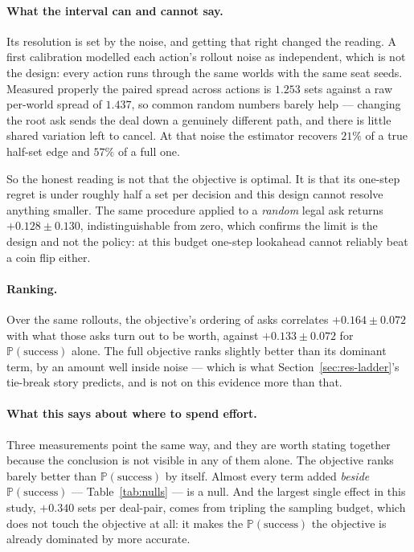 \documentclass[11pt,a4paper]{article}
\newcommand{\Prob}{\ensuremath{\mathbb{P}}}
\begin{document}
\paragraph{What the interval can and cannot say.} Its resolution is set by the
noise, and getting that right changed the reading. A first calibration modelled
each action's rollout noise as independent, which is not the design: every
action runs through the same worlds with the same seat seeds. Measured properly
the paired spread across actions is $1.253$ sets against a raw per-world spread
of $1.437$, so common random numbers barely help --- changing the root ask sends
the deal down a genuinely different path, and there is little shared variation
left to cancel. At that noise the estimator recovers $21\%$ of a true half-set
edge and $57\%$ of a full one.

So the honest reading is not that the objective is optimal. It is that its
one-step regret is under roughly half a set per decision and this design cannot
resolve anything smaller. The same procedure applied to a \emph{random} legal ask
returns $+0.128 \pm 0.130$, indistinguishable from zero, which confirms the limit
is the design and not the policy: at this budget one-step lookahead cannot
reliably beat a coin flip either.

\paragraph{Ranking.} Over the same rollouts, the objective's ordering of asks
correlates $+0.164 \pm 0.072$ with what those asks turn out to be worth, against
$+0.133 \pm 0.072$ for $\Prob(\text{success})$ alone. The full objective ranks
slightly better than its dominant term, by an amount well inside noise --- which
is what Section~\ref{sec:res-ladder}'s tie-break story predicts, and is not on
this evidence more than that.

\paragraph{What this says about where to spend effort.} Three measurements point
the same way, and they are worth stating together because the conclusion is not
visible in any of them alone. The objective ranks barely better than
$\Prob(\text{success})$ by itself. Almost every term added \emph{beside}
$\Prob(\text{success})$ --- Table~\ref{tab:nulls} --- is a null. And the largest
single effect in this study, $+0.340$ sets per deal-pair, comes from tripling the
sampling budget, which does not touch the objective at all: it makes the
$\Prob(\text{success})$ the objective is already dominated by more accurate.
\end{document}

